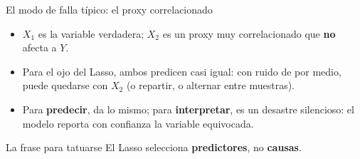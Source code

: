 \documentclass{beamer}
\newcommand{\1}{\mathbb{I}}
\begin{document}
\begin{frame}{El modo de falla típico: el proxy correlacionado}
\small
\begin{center}
\end{center}

\begin{itemize}\itemsep2pt
  \item $X_1$ es la variable verdadera; $X_2$ es un proxy muy correlacionado que \textbf{no} afecta a $Y$.
  \item Para el ojo del Lasso, ambos predicen casi igual: con ruido de por medio, puede quedarse con $X_2$ (o repartir, o alternar entre muestras). \pause
  \item Para \textbf{predecir}, da lo mismo; para \textbf{interpretar}, es un desastre silencioso: el modelo reporta con confianza la variable equivocada.
\end{itemize}
\pause

\begin{block}{La frase para tatuarse}
El Lasso selecciona \textbf{predictores}, no \textbf{causas}.
\end{block}
\end{frame}
\end{document}
